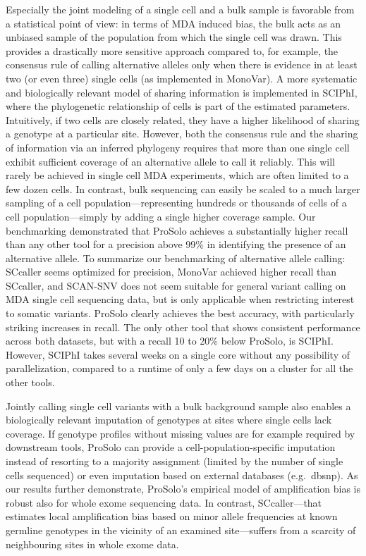 \documentclass[12pt,inline]{wlscirep}
\begin{document}
Especially the joint modeling of a single cell and a bulk sample is favorable from a statistical point of view: in terms of MDA induced bias, the bulk acts as an unbiased sample of the population from which the single cell was drawn.
This provides a drastically more sensitive approach compared to, for example, the consensus rule of calling alternative alleles only when there is evidence in at least two (or even three) single cells (as implemented in MonoVar\cite{zafar_monovar:_2016}).
A more systematic and biologically relevant model of sharing information is implemented in SCIPhI, where the phylogenetic relationship of cells is part of the estimated parameters.
Intuitively, if two cells are closely related, they have a higher likelihood of sharing a genotype at a particular site.
However, both the consensus rule and the sharing of information via an inferred phylogeny requires that more than one single cell exhibit sufficient coverage of an alternative allele to call it reliably.
This will rarely be achieved in single cell MDA experiments, which are often limited to a few dozen cells.
In contrast, bulk sequencing can easily be scaled to a much larger sampling of a cell population---representing hundreds or thousands of cells of a cell population---simply by adding a single higher coverage sample.
Our benchmarking demonstrated that ProSolo achieves a substantially higher recall than any other tool for a precision above 99\% in identifying the presence of an alternative allele.
To summarize our benchmarking of alternative allele calling: SCcaller seems optimized for precision, MonoVar achieved higher recall than SCcaller, and SCAN-SNV does not seem suitable for general variant calling on MDA single cell sequencing data, but is only applicable when restricting interest to somatic variants.
ProSolo clearly achieves the best accuracy, with particularly striking increases in recall. 
The only other tool that shows consistent performance across both datasets, but with a recall 10 to 20\% below ProSolo, is SCIPhI.
However, SCIPhI takes several weeks on a single core without any possibility of parallelization, compared to a runtime of only a few days on a cluster for all the other tools.

Jointly calling single cell variants with a bulk background sample also enables a biologically relevant imputation of genotypes at sites where single cells lack coverage.
If genotype profiles without missing values are for example required by downstream tools, ProSolo can provide a cell-population-specific imputation instead of resorting to a majority assignment (limited by the number of single cells sequenced) or even imputation based on external databases (e.g.~dbsnp).
As our results further demonstrate, ProSolo’s empirical model of amplification bias is robust also for whole exome sequencing data. 
In contrast, SCcaller---that estimates local amplification bias based on minor allele frequencies at known germline genotypes in the vicinity of an examined site---suffers from a scarcity of neighbouring sites in whole exome data.
\end{document}
